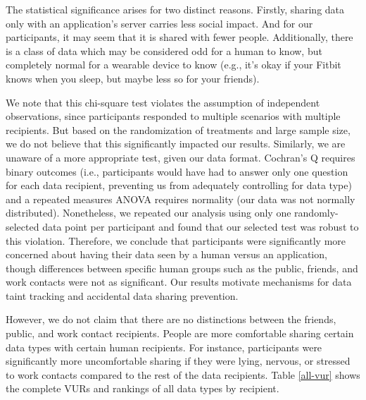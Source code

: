 \documentclass{sig-alternate-hotpets15}
\begin{document}
The statistical significance arises for two distinct reasons. Firstly, sharing data only with an application's server carries less social impact. And for our participants, it may seem that it is shared with fewer people. Additionally, there is a class of data which may be considered odd for a human to know, but completely normal for a wearable device to know (e.g., it's okay if your Fitbit knows when you sleep, but maybe less so for your friends).

We note that this chi-square test violates the assumption of independent observations, since participants responded to multiple scenarios with multiple recipients. But based on the randomization of treatments and large sample size, we do not believe that this significantly impacted our results. Similarly, we are unaware of a more appropriate test, given our data format. Cochran's Q requires binary outcomes (i.e., participants would have had to answer only one question for each data recipient, preventing us from adequately controlling for data type) and a repeated measures ANOVA requires normality (our data was not normally distributed). Nonetheless, we repeated our analysis using only one randomly-selected data point per participant and found that our selected test was robust to this violation. Therefore, we conclude that participants were significantly more concerned about having their data seen by a human versus an application, though differences between specific human groups such as the public, friends, and work contacts were not as significant. Our results motivate mechanisms for data taint tracking and accidental data sharing prevention.

However, we do not claim that there are no distinctions between the friends, public, and work contact recipients. People are more comfortable sharing certain data types with certain human recipients. For instance, participants were significantly more uncomfortable sharing if they were lying, nervous, or stressed to work contacts compared to the rest of the data recipients. Table \ref{all-vur} shows the complete VURs and rankings of all data types by recipient.\\
\end{document}
